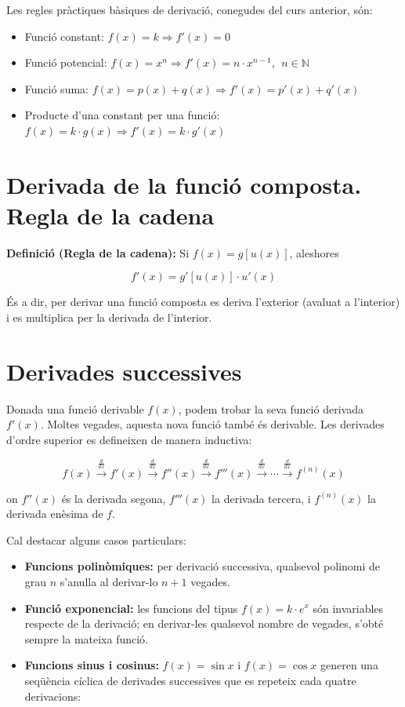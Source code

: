 Les regles pràctiques bàsiques de derivació, conegudes del curs anterior, són:

\begin{itemize}
\item Funció constant: $f(x) = k \Rightarrow f'(x) = 0$
\item Funció potencial: $f(x) = x^n \Rightarrow f'(x) = n \cdot x^{n-1}$, $\; n \in \mathbb{N}$
\item Funció suma: $f(x) = p(x) + q(x) \Rightarrow f'(x) = p'(x) + q'(x)$
\item Producte d'una constant per una funció: $f(x) = k \cdot g(x) \Rightarrow f'(x) = k \cdot g'(x)$
\end{itemize}

\section{Derivada de la funció composta. Regla de la cadena}

\textbf{Definició (Regla de la cadena):} Si $f(x) = g[u(x)]$, aleshores

\begin{equation}
f'(x) = g'[u(x)] \cdot u'(x)
\end{equation}

És a dir, per derivar una funció composta es deriva l'exterior (avaluat a l'interior) i es multiplica per la derivada de l'interior.

\section{Derivades successives}

Donada una funció derivable $f(x)$, podem trobar la seva funció derivada $f'(x)$. Moltes vegades, aquesta nova funció també és derivable. Les derivades d'ordre superior es defineixen de manera inductiva:

\begin{equation*}
f(x) \xrightarrow{\ \frac{d}{dx}\ } f'(x) \xrightarrow{\ \frac{d}{dx}\ } f''(x) \xrightarrow{\ \frac{d}{dx}\ } f'''(x) \xrightarrow{\ \frac{d}{dx}\ } \cdots \xrightarrow{\ \frac{d}{dx}\ } f^{(n)}(x)
\end{equation*}

on $f''(x)$ és la derivada segona, $f'''(x)$ la derivada tercera, i $f^{(n)}(x)$ la derivada enèsima de $f$.

Cal destacar alguns casos particulars:

\begin{itemize}
\item \textbf{Funcions polinòmiques:} per derivació successiva, qualsevol polinomi de grau $n$ s'anul\textperiodcentered{}la al derivar-lo $n + 1$ vegades.
\item \textbf{Funció exponencial:} les funcions del tipus $f(x) = k \cdot e^x$ són invariables respecte de la derivació; en derivar-les qualsevol nombre de vegades, s'obté sempre la mateixa funció.
\item \textbf{Funcions sinus i cosinus:} $f(x) = \sin x$ i $f(x) = \cos x$ generen una seqüència cíclica de derivades successives que es repeteix cada quatre derivacions:
\end{itemize}

